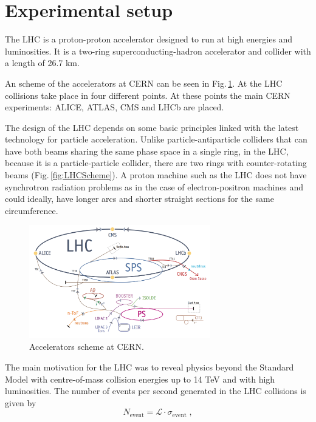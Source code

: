 \documentclass[12pt, twoside]{article}
\numberwithin{equation}{section}
\numberwithin{figure}{section}
\begin{document}
\section{Experimental setup}
\label{ExpSet}
\vspace{1.0cm}

The LHC is a proton-proton accelerator designed to run at high energies and luminosities. It is a two-ring superconducting-hadron accelerator and collider with a length of 26.7 km.

An scheme of the accelerators at CERN can be seen in Fig.\,\ref{fig:AcceleratorsScheme}. At the LHC collisions take place in four different points. At these points the main CERN experiments: ALICE, ATLAS, CMS and LHCb are placed.

The design of the LHC depends on some basic principles linked with the latest technology for particle acceleration. Unlike particle-antiparticle colliders that can have both beams sharing the same phase space in a single ring, in the LHC, because it is a particle-particle collider, there are two rings with counter-rotating beams (Fig.\,\ref{fig:LHCScheme}). A proton machine such as the LHC does not have synchrotron radiation problems as in the case of electron-positron machines and could ideally, have longer arcs and shorter straight sections for the same circumference.
\begin{figure}[h]
    \centering
    \includegraphics[width=0.7\textwidth]{./images/LHC_Scheme.png}
    \captionsetup{width=0.9\textwidth}
    \caption{Accelerators scheme at CERN.}
    \label{fig:AcceleratorsScheme}
\end{figure}

The main motivation for the LHC was to reveal physics beyond the Standard Model with centre-of-mass collision energies up to 14 TeV and with high luminosities. The number of events per second generated in the LHC collisions is given by
\begin{equation}    \label{eq:NumberOfEvents}
    N_{\text{event}} = \mathcal{L} \cdot \sigma_{\text{event}} \;,
\end{equation}
\end{document}
